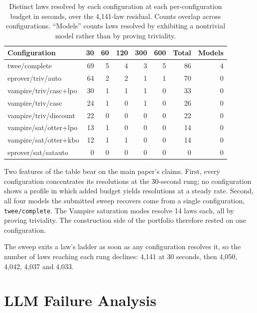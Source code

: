 \documentclass[letterpaper]{article}
\begin{document}
\begin{table}[t]
\centering
\begin{tabular}{@{}lrrrrrrr@{}}
\toprule
Configuration & 30 & 60 & 120 & 300 & 600 & Total & Models \\
\midrule
twee/complete         & 69 & 5 & 4 & 3 & 5 & 86 & 4 \\
eprover/triv/auto     & 64 & 2 & 2 & 1 & 1 & 70 & 0 \\
vampire/triv/casc+lpo & 30 & 1 & 1 & 1 & 0 & 33 & 0 \\
vampire/triv/casc     & 24 & 1 & 0 & 1 & 0 & 26 & 0 \\
vampire/triv/discount & 22 & 0 & 0 & 0 & 0 & 22 & 0 \\
vampire/sat/otter+lpo & 13 & 1 & 0 & 0 & 0 & 14 & 0 \\
vampire/sat/otter+kbo & 12 & 1 & 1 & 0 & 0 & 14 & 0 \\
eprover/sat/satauto   &  0 & 0 & 0 & 0 & 0 &  0 & 0 \\
\bottomrule
\end{tabular}
\caption{Distinct laws resolved by each configuration at each per-configuration
budget in seconds, over the 4,141-law residual. Counts overlap across
configurations. ``Models'' counts laws resolved by exhibiting a nontrivial
model rather than by proving triviality.}
\label{tab:perconfig}
\end{table}

Two features of the table bear on the main paper's claims. First, every
configuration concentrates its resolutions at the 30-second rung; no
configuration shows a profile in which added budget yields resolutions at a
steady rate. Second, all four models the submitted sweep recovers come from a
single configuration, \texttt{twee/complete}. The Vampire saturation modes
resolve 14 laws each, all by proving triviality. The construction side of the
portfolio therefore rested on one configuration.

The sweep exits a law's ladder as soon as any configuration resolves it, so the
number of laws reaching each rung declines: 4,141 at 30 seconds, then 4,050,
4,042, 4,037 and 4,033.

\section{LLM Failure Analysis}
\label{app:failures}
\end{document}
